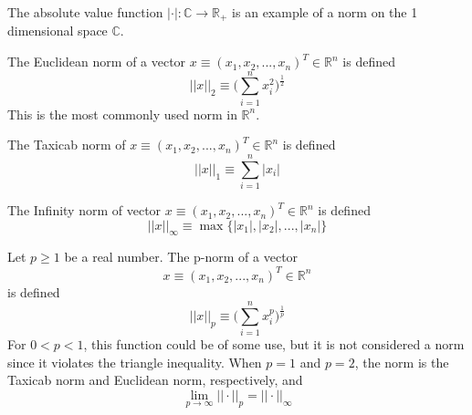 \documentclass{article}
\begin{document}
  \begin{example}
    The absolute value function $|\cdot|: \mathbb{C} \longrightarrow \mathbb{R}_+$ is an example of a norm on the 1 dimensional space $\mathbb{C}$. 
  \end{example}

  \begin{example}
    The Euclidean norm of a vector $x \equiv (x_1, x_2, ..., x_n)^T \in \mathbb{R}^n$ is defined
    \begin{equation}
      ||x||_2 \equiv \bigg( \sum_{i=1}^n x_i^2 \bigg)^{\frac{1}{2}}
    \end{equation}
    This is the most commonly used norm in $\mathbb{R}^n$. 
  \end{example}

  \begin{example}
    The Taxicab norm of $x \equiv (x_1, x_2, ..., x_n)^T \in \mathbb{R}^n$ is defined
    \begin{equation}
      ||x||_1 \equiv \sum_{i=1}^n |x_i|
    \end{equation}
  \end{example}

  \begin{example}
    The Infinity norm of vector $x \equiv (x_1, x_2, ..., x_n)^T \in \mathbb{R}^n$ is defined
    \begin{equation}
      ||x||_\infty \equiv \max{\{|x_1|, |x_2|, ..., |x_n|\}}
    \end{equation}
  \end{example}

  \begin{example}
    Let $p\geq 1$ be a real number. The p-norm of a vector 
    \begin{equation}
      x \equiv (x_1, x_2, ..., x_n)^T \in \mathbb{R}^n
    \end{equation}
    is defined
    \begin{equation}
      ||x||_p \equiv \bigg( \sum_{i=1}^n x_i^p \bigg)^{\frac{1}{p}}
    \end{equation}
    For $0<p<1$, this function could be of some use, but it is not considered a norm since it violates the triangle inequality. When $p = 1$ and $p =2$, the norm is the Taxicab norm and Euclidean norm, respectively, and 
    \begin{equation}
      \lim_{p \rightarrow \infty} ||\cdot||_p = ||\cdot||_\infty
    \end{equation}
  \end{example}
\end{document}
